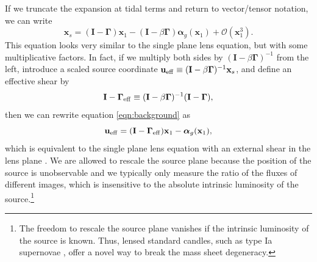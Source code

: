 \documentclass{emulateapj}
\newcommand\I[0]{\mathbf{I}}
\newcommand\GammaMat[0]{\boldsymbol{\Gamma}}
\newcommand\x[0]{\mathbf{x}}
\renewcommand\vec[1]{\mathbf{#1}}
\newcommand\al[0]{\boldsymbol{\alpha}}
\begin{document}
If we truncate the expansion at tidal terms and return to vector/tensor notation, we can write
\begin{equation}
\label{eqn:background}
\x_s = (\I - \GammaMat) \x_1  - (\I - \beta \GammaMat)\al_g(\x_1) + \mathcal{O}(\x_1^3).
\end{equation}
This equation looks very similar to the single plane lens equation, but with some multiplicative factors. In fact, if we multiply both sides by $(\I - \beta \GammaMat)^{-1}$ from the left, introduce a scaled source coordinate $\vec{u}_{\rm eff} \equiv (\I - \beta \GammaMat)^{-1} \x_s$, and define an effective shear by
\begin{equation}\label{eqn:Geff}
\I -\GammaMat_{\rm eff} \equiv (\I - \beta\GammaMat)^{-1} (\I - \GammaMat) ,
\end{equation}
then we can rewrite equation \ref{eqn:background} as
\begin{equation}
\vec{u}_{\rm eff} = (\I - \GammaMat_{\rm eff}) \x_1 - \al_g(\x_1),
\end{equation}
which is equivalent to the single plane lens equation with an external shear in the lens plane \citep[see also][]{Schneider97}. We are allowed to rescale the source plane because the position of the source is unobservable and we typically only measure the ratio of the fluxes of different images, which is insensitive to the absolute intrinsic luminosity of the source.\footnote{The freedom to rescale the source plane vanishes if the intrinsic luminosity of the source is known.  Thus, lensed standard candles, such as type Ia supernovae \citep{Kelly15, Patel14, Kolatt98}, offer a novel way to break the mass sheet degeneracy.}
\end{document}
